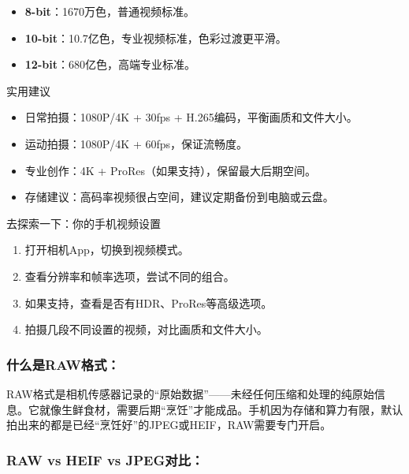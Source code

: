 \begin{itemize}
  \item \textbf{8-bit}：1670万色，普通视频标准。
  \item \textbf{10-bit}：10.7亿色，专业视频标准，色彩过渡更平滑。
  \item \textbf{12-bit}：680亿色，高端专业标准。
\end{itemize}

\begin{tcbinfo}{实用建议}
\begin{itemize}
  \item 日常拍摄：1080P/4K + 30fps + H.265编码，平衡画质和文件大小。
  \item 运动拍摄：1080P/4K + 60fps，保证流畅度。
  \item 专业创作：4K + ProRes（如果支持），保留最大后期空间。
  \item 存储建议：高码率视频很占空间，建议定期备份到电脑或云盘。
\end{itemize}

\end{tcbinfo}

\begin{tcbpractice}{去探索一下：你的手机视频设置}
\begin{enumerate}
  \item 打开相机App，切换到视频模式。
  \item 查看分辨率和帧率选项，尝试不同的组合。
  \item 如果支持，查看是否有HDR、ProRes等高级选项。
  \item 拍摄几段不同设置的视频，对比画质和文件大小。
\end{enumerate}

\end{tcbpractice}


\subsubsection*{什么是RAW格式：}

RAW格式是相机传感器记录的“原始数据”——未经任何压缩和处理的纯原始信息。它就像生鲜食材，需要后期“烹饪”才能成品。手机因为存储和算力有限，默认拍出来的都是已经“烹饪好”的JPEG或HEIF，RAW需要专门开启。

\subsubsection*{RAW vs HEIF vs JPEG对比：}

